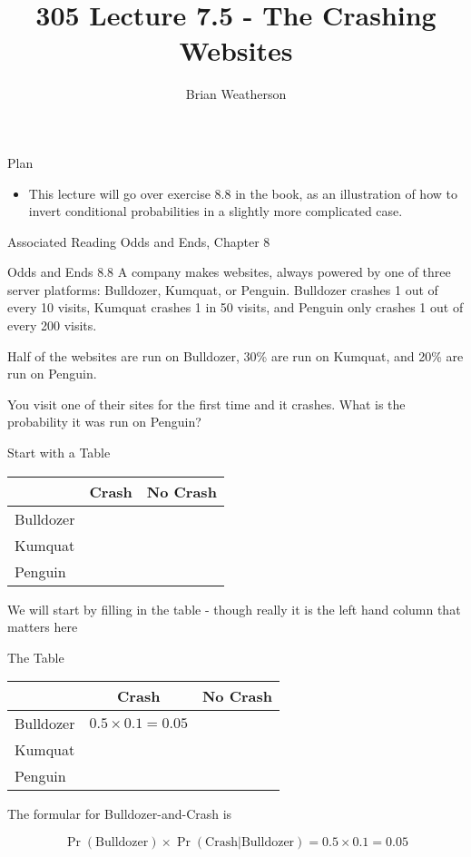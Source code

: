 \documentclass[
  ignorenonframetext,
]{beamer}
\title{305 Lecture 7.5 - The Crashing Websites}
\author{Brian Weatherson}
\date{}
\providecommand{\tightlist}{%
  \setlength{\itemsep}{0pt}\setlength{\parskip}{0pt}}
\renewcommand{\,}{\text{, }}
\begin{document}
\frame{\titlepage}

\begin{frame}{Plan}
\protect\hypertarget{plan}{}
\begin{itemize}
\tightlist
\item
  This lecture will go over exercise 8.8 in the book, as an illustration
  of how to invert conditional probabilities in a slightly more
  complicated case.
\end{itemize}
\end{frame}

\begin{frame}{Associated Reading}
\protect\hypertarget{associated-reading}{}
Odds and Ends, Chapter 8
\end{frame}

\begin{frame}{Odds and Ends 8.8}
\protect\hypertarget{odds-and-ends-8.8}{}
A company makes websites, always powered by one of three server
platforms: Bulldozer, Kumquat, or Penguin. Bulldozer crashes 1 out of
every 10 visits, Kumquat crashes 1 in 50 visits, and Penguin only
crashes 1 out of every 200 visits.

Half of the websites are run on Bulldozer, 30\% are run on Kumquat, and
20\% are run on Penguin.

You visit one of their sites for the first time and it crashes. What is
the probability it was run on Penguin?
\end{frame}

\begin{frame}{Start with a Table}
\protect\hypertarget{start-with-a-table}{}
\begin{longtable}[]{@{}lcc@{}}
\toprule
& Crash & No Crash \\
\midrule
\endhead
Bulldozer & & \\
Kumquat & & \\
Penguin & & \\
\bottomrule
\end{longtable}

We will start by filling in the table - though really it is the left
hand column that matters here
\end{frame}

\begin{frame}{The Table}
\protect\hypertarget{the-table}{}
\begin{longtable}[]{@{}lcc@{}}
\toprule
& Crash & No Crash \\
\midrule
\endhead
Bulldozer & \(0.5 \times 0.1 = 0.05\) & \\
Kumquat & & \\
Penguin & & \\
\bottomrule
\end{longtable}

The formular for Bulldozer-and-Crash is

\[
\Pr(\text{Bulldozer}) \times \Pr(\text{Crash}|\text{Bulldozer}) = 0.5 \times 0.1 = 0.05
\]
\end{frame}
\end{document}
